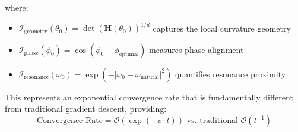 where:
\begin{itemize}
    \item $\mathcal{I}_{\text{geometry}}(\theta_0) = \det(\mathbf{H}(\theta_0))^{1/d}$ captures the local curvature geometry
    \item $\mathcal{I}_{\text{phase}}(\phi_0) = \cos(\phi_0 - \phi_{\text{optimal}})$ measures phase alignment
    \item $\mathcal{I}_{\text{resonance}}(\omega_0) = \exp(-|\omega_0 - \omega_{\text{natural}}|^2)$ quantifies resonance proximity
\end{itemize}

This represents an exponential convergence rate that is fundamentally different from traditional gradient descent, providing:
\begin{equation}
\text{Convergence Rate} = \mathcal{O}(\exp(-c \cdot t)) \text{ vs. traditional } \mathcal{O}(t^{-1})
\end{equation}